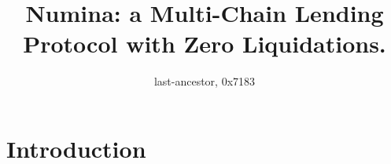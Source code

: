 \documentclass[12pt]{paper}
\title{Numina: a Multi-Chain Lending Protocol with Zero Liquidations.}
\author{last-ancestor, 0x7183}
\date{}
\begin{document}
\maketitle


\begin{abstract}
	
\end{abstract}
	

\section{Introduction}
\label{sec:introduction}
\end{document}
